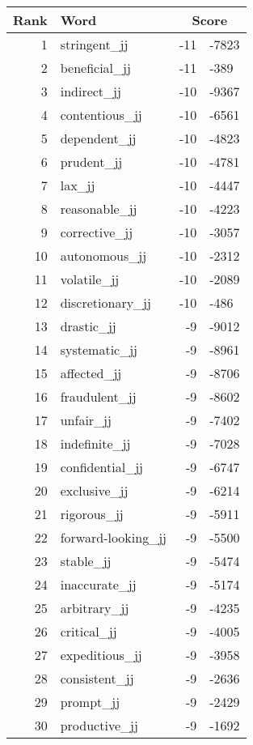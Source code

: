 \begin{longtable}[!htbp]{| rlr@{.}l |}
    \hline
    \textbf{Rank} & \textbf{Word} & \multicolumn{2}{c|}{\textbf{Score}} \\
    \hline
    \endhead
    1 & stringent\_jj & -11 & -7823 \\
    2 & beneficial\_jj & -11 & -389 \\
    3 & indirect\_jj & -10 & -9367 \\
    4 & contentious\_jj & -10 & -6561 \\
    5 & dependent\_jj & -10 & -4823 \\
    6 & prudent\_jj & -10 & -4781 \\
    7 & lax\_jj & -10 & -4447 \\
    8 & reasonable\_jj & -10 & -4223 \\
    9 & corrective\_jj & -10 & -3057 \\
    10 & autonomous\_jj & -10 & -2312 \\
    11 & volatile\_jj & -10 & -2089 \\
    12 & discretionary\_jj & -10 & -486 \\
    13 & drastic\_jj & -9 & -9012 \\
    14 & systematic\_jj & -9 & -8961 \\
    15 & affected\_jj & -9 & -8706 \\
    16 & fraudulent\_jj & -9 & -8602 \\
    17 & unfair\_jj & -9 & -7402 \\
    18 & indefinite\_jj & -9 & -7028 \\
    19 & confidential\_jj & -9 & -6747 \\
    20 & exclusive\_jj & -9 & -6214 \\
    21 & rigorous\_jj & -9 & -5911 \\
    22 & forward-looking\_jj & -9 & -5500 \\
    23 & stable\_jj & -9 & -5474 \\
    24 & inaccurate\_jj & -9 & -5174 \\
    25 & arbitrary\_jj & -9 & -4235 \\
    26 & critical\_jj & -9 & -4005 \\
    27 & expeditious\_jj & -9 & -3958 \\
    28 & consistent\_jj & -9 & -2636 \\
    29 & prompt\_jj & -9 & -2429 \\
    30 & productive\_jj & -9 & -1692 \\

\end{longtable}

